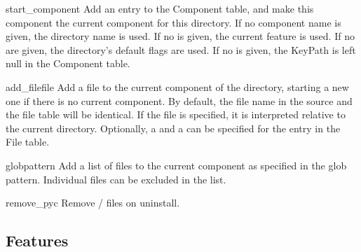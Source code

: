 \begin{methoddesc}[Directory]{start_component}{}
  Add an entry to the Component table, and make this component the
  current component for this directory. If no component name is given, the
  directory name is used. If no  is given, the current feature
  is used. If no  are given, the directory's default flags are
  used. If no  is given, the KeyPath is left null in the
  Component table.
\end{methoddesc}

\begin{methoddesc}[Directory]{add_file}{file}
  Add a file to the current component of the directory, starting a new
  one if there is no current component. By default, the file name
  in the source and the file table will be identical. If the  file
  is specified, it is interpreted relative to the current
  directory. Optionally, a  and a  can be specified for
  the entry in the File table.
\end{methoddesc}

\begin{methoddesc}[Directory]{glob}{pattern}
  Add a list of files to the current component as specified in the glob
  pattern. Individual files can be excluded in the  list.
\end{methoddesc}

\begin{methoddesc}[Directory]{remove_pyc}{}
  Remove / files on uninstall.
\end{methoddesc}

\begin{seealso}
\end{seealso}


\subsection{Features\label{features}}

